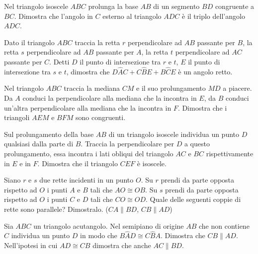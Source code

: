 \begin{multicols}{2}
\begin{esercizio}
\label{ese:3.76}
Nel triangolo isoscele $ABC$ prolunga la base $AB$ di un segmento $BD$ congruente a $BC$. Dimostra che l'angolo in $C$ esterno al triangolo $ADC$ è il triplo dell'angolo $ADC$.
\end{esercizio}

\begin{esercizio}
\label{ese:3.77}
Dato il triangolo $ABC$ traccia la retta $r$ perpendicolare ad $AB$ passante per $B$, la retta $s$ perpendicolare ad $AB$ passante per $A$, la retta $t$ perpendicolare ad $AC$ passante per $C$. Detti $D$ il punto di intersezione tra $r$ e $t$, $E$ il punto di intersezione tra $s$ e $t$, dimostra che $D\widehat{A}C+C\widehat{B}E+B\widehat{C}E$ è un angolo retto.
\end{esercizio}

\begin{esercizio}
\label{ese:3.78}
Nel triangolo $ABC$ traccia la mediana $CM$ e il suo prolungamento $MD$ a piacere. Da $A$ conduci la perpendicolare alla mediana che la incontra in $E$, da $B$ conduci un'altra perpendicolare alla mediana che la incontra in $F$. Dimostra che i triangoli $AEM$ e $BFM$ sono congruenti.
\end{esercizio}

\begin{esercizio}
\label{ese:3.79}
Sul prolungamento della base $AB$ di un triangolo isoscele individua un punto $D$ qualsiasi dalla parte di $B$. Traccia la perpendicolare per $D$ a questo prolungamento, essa incontra i lati obliqui del triangolo $AC$ e $BC$ rispettivamente in $E$ e in $F$. Dimostra che il triangolo $CEF$ è isoscele.
\end{esercizio}

\begin{esercizio}
\label{ese:3.80}
Siano $r$ e $s$ due rette incidenti in un punto $O$. Su $r$ prendi da parte opposta rispetto ad $O$ i punti $A$ e $B$ tali che $AO\cong OB$. Su $s$ prendi da parte opposta rispetto ad $O$ i punti $C$ e $D$ tali che $CO\cong OD$. Quale delle seguenti coppie di rette sono parallele? Dimostralo. ($CA\parallel BD$, $CB\parallel AD$)
\end{esercizio}

\begin{esercizio}
\label{ese:3.81}
Sia $ABC$ un triangolo acutangolo. Nel semipiano di origine $AB$ che non contiene $C$ individua un punto $D$ in modo che $B\widehat{A}D\cong C\widehat{B}A$. Dimostra che $CB\parallel AD$. Nell'ipotesi in cui $AD\cong CB$ dimostra che anche $AC\parallel BD$.
\end{esercizio}

\end{multicols}

